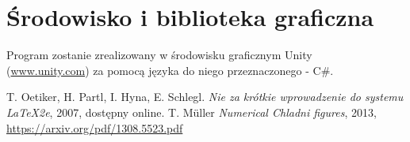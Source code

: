 \documentclass{classrep}
\begin{document}
\section{Środowisko i biblioteka graficzna}
Program zostanie zrealizowany w środowisku graficznym Unity\\ (\url{www.unity.com}) za pomocą języka do niego przeznaczonego - C\#.

\begin{thebibliography}{0}
   T. Oetiker, H. Partl, I. Hyna, E. Schlegl.
    \textsl{Nie za krótkie wprowadzenie do systemu \LaTeX2e}, 2007, dostępny
    online.
   T. Müller
    \textsl{Numerical Chladni figures}, 2013, \url{https://arxiv.org/pdf/1308.5523.pdf}
\end{thebibliography}
\end{document}
